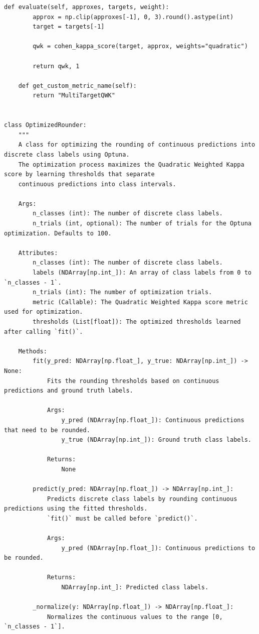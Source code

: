 \documentclass[12pt]{extarticle}
\begin{document}
\begin{mdframed}
\begin{lstlisting}[breaklines=true]
    def evaluate(self, approxes, targets, weight):
        approx = np.clip(approxes[-1], 0, 3).round().astype(int)
        target = targets[-1]

        qwk = cohen_kappa_score(target, approx, weights="quadratic")

        return qwk, 1

    def get_custom_metric_name(self):
        return "MultiTargetQWK"


class OptimizedRounder:
    """
    A class for optimizing the rounding of continuous predictions into discrete class labels using Optuna.
    The optimization process maximizes the Quadratic Weighted Kappa score by learning thresholds that separate
    continuous predictions into class intervals.

    Args:
        n_classes (int): The number of discrete class labels.
        n_trials (int, optional): The number of trials for the Optuna optimization. Defaults to 100.

    Attributes:
        n_classes (int): The number of discrete class labels.
        labels (NDArray[np.int_]): An array of class labels from 0 to `n_classes - 1`.
        n_trials (int): The number of optimization trials.
        metric (Callable): The Quadratic Weighted Kappa score metric used for optimization.
        thresholds (List[float]): The optimized thresholds learned after calling `fit()`.

    Methods:
        fit(y_pred: NDArray[np.float_], y_true: NDArray[np.int_]) -> None:
            Fits the rounding thresholds based on continuous predictions and ground truth labels.

            Args:
                y_pred (NDArray[np.float_]): Continuous predictions that need to be rounded.
                y_true (NDArray[np.int_]): Ground truth class labels.

            Returns:
                None

        predict(y_pred: NDArray[np.float_]) -> NDArray[np.int_]:
            Predicts discrete class labels by rounding continuous predictions using the fitted thresholds.
            `fit()` must be called before `predict()`.

            Args:
                y_pred (NDArray[np.float_]): Continuous predictions to be rounded.

            Returns:
                NDArray[np.int_]: Predicted class labels.

        _normalize(y: NDArray[np.float_]) -> NDArray[np.float_]:
            Normalizes the continuous values to the range [0, `n_classes - 1`].


\end{lstlisting}
\end{mdframed}
\end{document}
